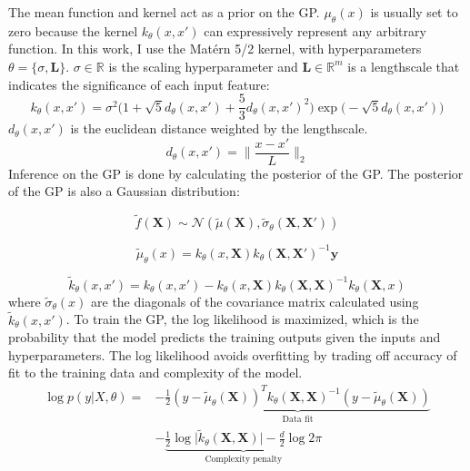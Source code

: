 The mean function and kernel act as a prior on the GP.  $\mu_{\theta}(x)$ is usually set to zero because the kernel  $k_{\theta}(x, x')$ can expressively represent any arbitrary function. In this work, I use the Matérn 5/2 kernel, with hyperparameters $\theta=\{\sigma,\mathbf L \}$. $\sigma \in \mathbb R$ is the scaling hyperparameter and $\mathbf L \in \mathbb R^m$ is a lengthscale that indicates the significance of each input feature:
\begin{equation}
    k_{\theta}(x, x') = \sigma^2 \biggl(1 + \sqrt{5}d_{\theta}(x,x')+\frac{5}{3}d_{\theta}(x,x')^2\biggr)\exp\biggl(-\sqrt{5}d_{\theta}(x,x') \biggr)
\end{equation}
$d_{\theta}(x,x')$ is the euclidean distance weighted by the lengthscale.
\begin{equation}
    d_{\theta}(x,x')=\biggl\lVert \frac{x-x'}{L} \biggr\rVert_2
\end{equation}
Inference on the GP is done by calculating the posterior of the GP. The posterior of the GP is also a Gaussian distribution:

\begin{equation}
     \tilde f(\mathbf X) \sim \mathcal N(\tilde \mu(\mathbf X), \tilde \sigma_{\theta}(\mathbf X, \mathbf X'))
\end{equation}

\begin{equation}
    \tilde \mu_{\theta}(x) = k_{\theta}(x, \mathbf X)k_{\theta}(\mathbf X, \mathbf X')^{-1} \mathbf y
\end{equation}

\begin{equation}
    \tilde k_{\theta}(x,x') = k_{\theta}( x, x')-k_{\theta}(x, \mathbf X) k_{\theta}(\mathbf X, \mathbf X)^{-1}k_{\theta}(\mathbf X, x)
\end{equation}
where $\tilde \sigma_{\theta}(x)$ are the diagonals of the covariance matrix calculated using $\tilde k_{\theta}(x, x')$.
To train the GP, the log likelihood is maximized, which is the probability that the model predicts the training outputs given the inputs and hyperparameters. The log likelihood avoids overfitting by trading off accuracy of fit to the training data and complexity of the model.
\begin{equation}
\begin{split}
    \log p(y \vert X, \theta) = & -\underbrace{\frac{1}{2}(y-\tilde \mu_{\theta}(\mathbf X))^T k_{\theta}(\mathbf X, \mathbf X)^{-1}(y- \tilde\mu_{\theta}(\mathbf X)) }_{\text{Data  fit}} \\
    & - \underbrace{\frac{1}{2} \log{\vert \tilde k_{\theta}(\mathbf X, \mathbf X) \vert} - \frac{d}{2}\log{2 \pi}}_{\text{Complexity penalty}}
\end{split}
\end{equation}


